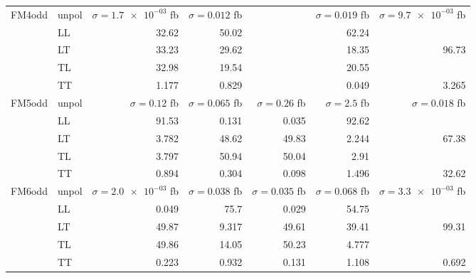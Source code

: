 \begin{table}[h]
{\begin{tabular}{llrrrrr}
\midrule
\multirow{5}{*}{FM4odd}
 & unpol & $\sigma = \num{1.7e-03}$ fb & $\sigma = \num{0.012}$ fb &  & $\sigma = \num{0.019}$ fb & $\sigma = \num{9.7e-03}$ fb \\
 & LL & \num{32.62} & \num{50.02} &  & \num{62.24} &  \\
 & LT & \num{33.23} & \num{29.62} &  & \num{18.35} & \num{96.73} \\
 & TL & \num{32.98} & \num{19.54} &  & \num{20.55} &  \\
 & TT & \num{1.177} & \num{0.829} &  & \num{0.049} & \num{3.265} \\
\midrule
\multirow{5}{*}{FM5odd}
 & unpol & $\sigma = \num{0.12}$ fb & $\sigma = \num{0.065}$ fb & $\sigma = \num{0.26}$ fb & $\sigma = \num{2.5}$ fb & $\sigma = \num{0.018}$ fb \\
 & LL & \num{91.53} & \num{0.131} & \num{0.035} & \num{92.62} &  \\
 & LT & \num{3.782} & \num{48.62} & \num{49.83} & \num{2.244} & \num{67.38} \\
 & TL & \num{3.797} & \num{50.94} & \num{50.04} & \num{2.91} &  \\
 & TT & \num{0.894} & \num{0.304} & \num{0.098} & \num{1.496} & \num{32.62} \\
\midrule
\multirow{5}{*}{FM6odd}
 & unpol & $\sigma = \num{2.0e-03}$ fb & $\sigma = \num{0.038}$ fb & $\sigma = \num{0.035}$ fb & $\sigma = \num{0.068}$ fb & $\sigma = \num{3.3e-03}$ fb \\
 & LL & \num{0.049} & \num{75.7} & \num{0.029} & \num{54.75} &  \\
 & LT & \num{49.87} & \num{9.317} & \num{49.61} & \num{39.41} & \num{99.31} \\
 & TL & \num{49.86} & \num{14.05} & \num{50.23} & \num{4.777} &  \\
 & TT & \num{0.223} & \num{0.932} & \num{0.131} & \num{1.108} & \num{0.692} \\
\bottomrule
\end{tabular}
}%
\end{table}